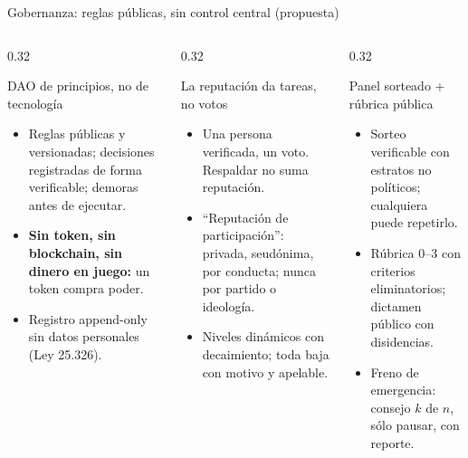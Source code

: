 \documentclass[aspectratio=169,11pt]{beamer}
\begin{document}
\begin{frame}{Gobernanza: reglas públicas, sin control central (propuesta)}
  \begin{columns}[T]
    \begin{column}{0.32\textwidth}
      \begin{block}{DAO de principios, no de tecnología}
        \footnotesize
        \begin{itemize}
          \item Reglas públicas y versionadas; decisiones registradas de forma verificable; demoras antes de ejecutar.
          \item \textbf{Sin token, sin blockchain, sin dinero en juego:} un token compra poder.
          \item Registro append-only sin datos personales (Ley 25.326).
        \end{itemize}
      \end{block}
    \end{column}
    \begin{column}{0.32\textwidth}
      \begin{block}{La reputación da tareas, no votos}
        \footnotesize
        \begin{itemize}
          \item Una persona verificada, un voto. Respaldar no suma reputación.
          \item ``Reputación de participación'': privada, seudónima, por conducta; nunca por partido o ideología.
          \item Niveles dinámicos con decaimiento; toda baja con motivo y apelable.
        \end{itemize}
      \end{block}
    \end{column}
    \begin{column}{0.32\textwidth}
      \begin{block}{Panel sorteado + rúbrica pública}
        \footnotesize
        \begin{itemize}
          \item Sorteo verificable con estratos no políticos; cualquiera puede repetirlo.
          \item Rúbrica 0--3 con criterios eliminatorios; dictamen público con disidencias.
          \item Freno de emergencia: consejo $k$ de $n$, sólo pausar, con reporte.

\end{itemize}
\end{block}
\end{column}
\end{columns}
\end{frame}
\end{document}
